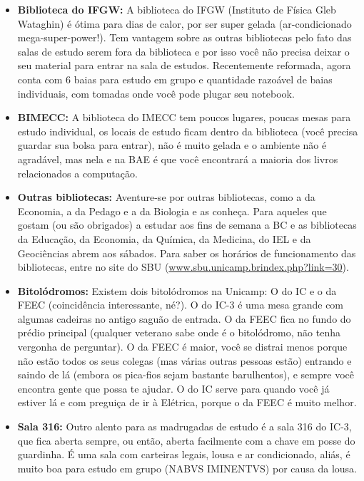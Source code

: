 \begin{itemize}
    \item  \textbf{Biblioteca do IFGW:} A biblioteca do IFGW (Instituto de Física
    Gleb Wataghin) é ótima para dias de calor, por ser super gelada (ar-condicionado
    mega-super-power!). Tem vantagem sobre as outras bibliotecas pelo fato das salas
    de estudo serem fora da biblioteca e por isso você não precisa deixar o seu
    material para entrar na sala de estudos. Recentemente reformada, agora conta
    com 6 baias para estudo em grupo e quantidade razoável de baias individuais, com tomadas
    onde você pode plugar seu notebook.

    \item  \textbf{BIMECC:} A biblioteca do IMECC tem poucos lugares, poucas
    mesas para estudo individual, os locais de estudo ficam dentro da biblioteca
    (você precisa guardar sua bolsa para entrar), não é muito gelada
    e o ambiente não é agradável, mas nela e na BAE é que você encontrará
    a maioria dos livros relacionados a computação.

    \item  \textbf{Outras bibliotecas:} Aventure-se por outras bibliotecas, como
    a da Economia, a da Pedago e a da Biologia e as conheça. Para aqueles que
    gostam (ou são obrigados) a estudar aos fins de semana a BC e as bibliotecas
    da Educação, da Economia, da Química, da Medicina, do IEL e da Geociências
    abrem aos sábados. Para saber os horários de funcionamento das bibliotecas,
    entre no site do SBU (\url{www.sbu.unicamp.brindex.php?link=30}).

    \item  \textbf{Bitolódromos:} Existem dois bitolódromos na Unicamp: O do IC
    e o da FEEC (coincidência interessante, né?). O do IC-3 é uma mesa grande
    com algumas cadeiras no antigo saguão de entrada. O da FEEC fica no fundo do
    prédio principal (qualquer veterano sabe onde é o bitolódromo, não tenha
    vergonha de perguntar). O da FEEC é maior, você se distrai menos porque não
    estão todos os seus colegas (mas várias outras pessoas estão) entrando
    e saindo de lá (embora os pica-fios sejam bastante barulhentos), e sempre
    você encontra gente que possa te ajudar. O do IC serve para quando você já
    estiver lá e com preguiça de ir à Elétrica, porque o da FEEC é muito melhor.

    \item  \textbf{Sala 316:} Outro alento para as madrugadas de estudo é a sala
    316 do IC-3, que fica aberta sempre, ou então, aberta facilmente com a chave
    em posse do guardinha. É uma sala com carteiras legais, lousa e ar
    condicionado, aliás, é muito boa para estudo em grupo (NABVS IMINENTVS) por
    causa da lousa.


\end{itemize}
